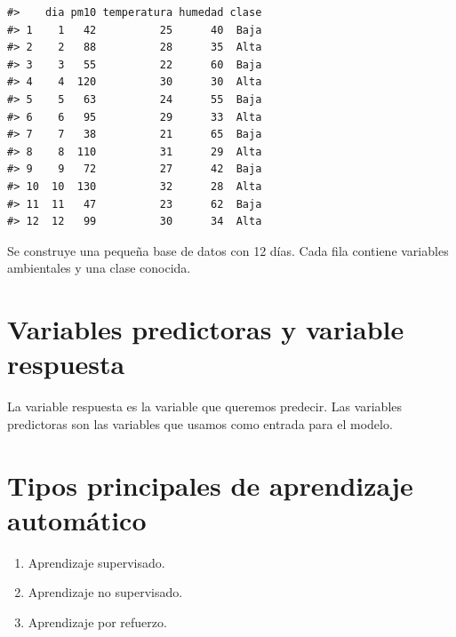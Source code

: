 \documentclass[
  spanish,
  10.5pt,
  letterpaper,
  openany,
  headings=big]{scrbook}
\providecommand{\tightlist}{%
  \setlength{\itemsep}{0pt}\setlength{\parskip}{0pt}}
\begin{document}
\begin{verbatim}
#>    dia pm10 temperatura humedad clase
#> 1    1   42          25      40  Baja
#> 2    2   88          28      35  Alta
#> 3    3   55          22      60  Baja
#> 4    4  120          30      30  Alta
#> 5    5   63          24      55  Baja
#> 6    6   95          29      33  Alta
#> 7    7   38          21      65  Baja
#> 8    8  110          31      29  Alta
#> 9    9   72          27      42  Baja
#> 10  10  130          32      28  Alta
#> 11  11   47          23      62  Baja
#> 12  12   99          30      34  Alta
\end{verbatim}

\begin{tcolorbox}[enhanced jigsaw, arc=.35mm, bottomrule=.15mm, bottomtitle=1mm, breakable, colback=white, colbacktitle=quarto-callout-note-color!10!white, colframe=quarto-callout-note-color-frame, coltitle=black, left=2mm, leftrule=.75mm, opacityback=0, opacitybacktitle=0.6, rightrule=.15mm, title=\textcolor{quarto-callout-note-color}{\faInfo}\hspace{0.5em}{Explicación del código}, titlerule=0mm, toprule=.15mm, toptitle=1mm]

Se construye una pequeña base de datos con 12 días. Cada fila contiene
variables ambientales y una clase conocida.

\end{tcolorbox}

\section{Variables predictoras y variable
respuesta}\label{variables-predictoras-y-variable-respuesta}

La variable respuesta es la variable que queremos predecir. Las
variables predictoras son las variables que usamos como entrada para el
modelo.

\section{Tipos principales de aprendizaje
automático}\label{tipos-principales-de-aprendizaje-automuxe1tico}

\begin{enumerate}
\def\labelenumi{\arabic{enumi}.}
\tightlist
\item
  Aprendizaje supervisado.
\item
  Aprendizaje no supervisado.
\item
  Aprendizaje por refuerzo.
\end{enumerate}
\end{document}
